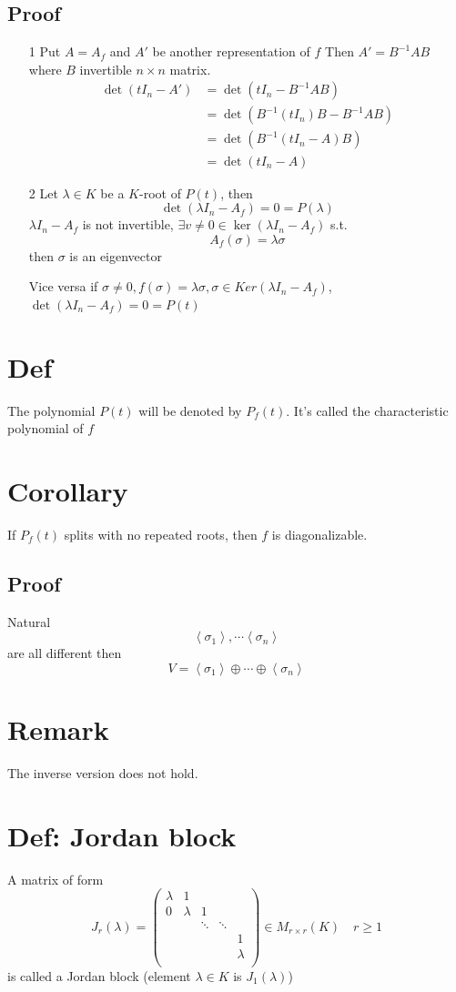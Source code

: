 \documentclass{book}
\begin{document}
\subsection*{Proof}
\begin{itemize}
    \item [1] Put $A=A_f$ and $A'$ be another representation of $f$ Then $A'=B^{-1}AB$ where $B$ invertible $n\times n$ matrix.
    $$
    \begin{aligned}
        \det(tI_n-A')&=\det(tI_n-B^{-1}AB)\\ &=\det(B^{-1}(tI_n)B-B^{-1}AB)\\ &=\det(B^{-1}(tI_n-A)B)\\ &=\det(tI_n-A)
    \end{aligned}
    $$
    \item[2] Let $\lambda\in K$ be a $K$-root of $P(t)$, then $$\det(\lambda I_n-A_f)=0=P(\lambda)$$
    $\lambda I_n-A_f$ is not invertible, $\exists v\neq0\in \ker(\lambda I_n-A_f)$ s.t. $$A_f(\sigma)=\lambda\sigma$$ then $\sigma$ is an eigenvector

    Vice versa if $\sigma\neq0,f(\sigma)=\lambda\sigma,\sigma\in Ker(\lambda I_n-A_f)$,$\det(\lambda I_n-A_f)=0=P(t)$ 
\end{itemize}
\section{Def}
The polynomial $P(t)$ will be  denoted by $P_f(t)$. It's called the characteristic polynomial of $f$
\section{Corollary}
If $P_f(t)$ splits with  no repeated roots, then $f$ is diagonalizable.
\subsection*{Proof}
Natural$$\left<\sigma_1\right>,\cdots\left<\sigma_n\right>$$
are all different then
$$V=\left<\sigma_1\right>\oplus\cdots\oplus\left<\sigma_n\right>$$
\section{Remark}
The inverse version does not hold.
\section{Def: Jordan block}A matrix of form
$$J_r(\lambda)=\begin{pmatrix}
    \lambda &1&&&\\
    0&\lambda&1&&\\
    &&\ddots&\ddots\\
    &&& &1\\
    &&&&\lambda\\
\end{pmatrix}\in M_{r\times r}(K) \quad r\geq 1$$ is called a Jordan block (element $\lambda\in K$ is $J_1(\lambda)$)
\end{document}
